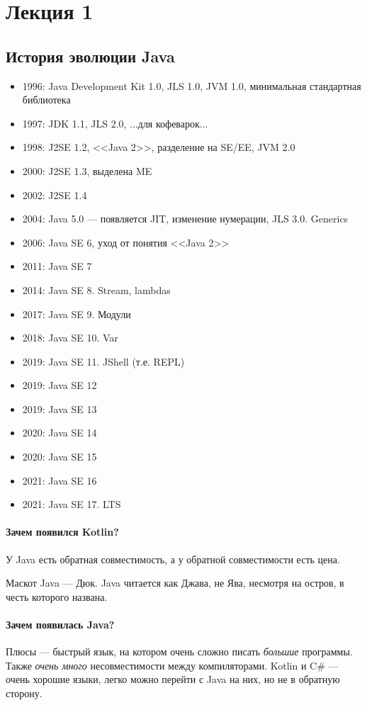 \section{Лекция 1}

\subsection{История эволюции Java}
\begin{itemize}
    \item 1996: Java Development Kit 1.0, JLS 1.0, JVM 1.0, минимальная стандартная библиотека
    \item 1997: JDK 1.1, JLS 2.0, ...для кофеварок...
    \item 1998: J2SE 1.2, <<Java 2>>, разделение на SE/EE, JVM 2.0
    \item 2000: J2SE 1.3, выделена ME
    \item 2002: J2SE 1.4
    \item 2004: Java 5.0 --- появляется JIT, изменение нумерации, JLS 3.0. Generics
    \item 2006: Java SE 6, уход от понятия <<Java 2>>
    \item 2011: Java SE 7
    \item 2014: Java SE 8. Stream, lambdas
    \item 2017: Java SE 9. Модули
    \item 2018: Java SE 10. Var
    \item 2019: Java SE 11. JShell (т.е. REPL)
    \item 2019: Java SE 12
    \item 2019: Java SE 13
    \item 2020: Java SE 14
    \item 2020: Java SE 15
    \item 2021: Java SE 16
    \item 2021: Java SE 17. LTS
\end{itemize}

\paragraph{Зачем появился Kotlin?}
У Java есть обратная совместимость,
а у обратной совместимости есть цена.

Маскот Java --- Дюк.
Java читается как Джава,
не Ява, несмотря на остров,
в честь которого названа.

\paragraph{Зачем появилась Java?}
Плюсы --- быстрый язык, на котором очень сложно писать \emph{большие} программы.
Также \emph{очень много} несовместимости между компиляторами.
Kotlin и C\# --- очень хорошие языки, легко можно перейти с Java на них,
но не в обратную сторону.

